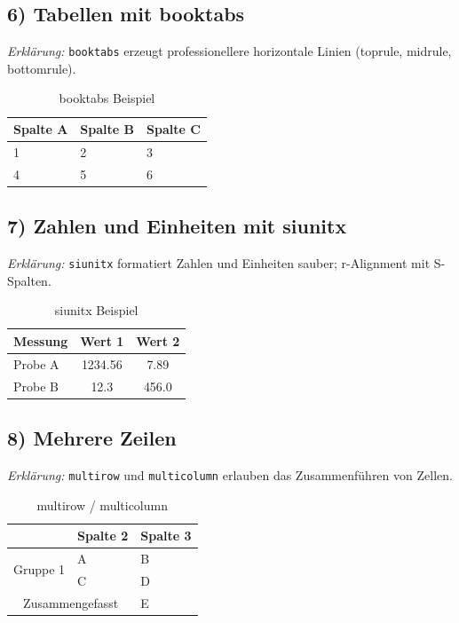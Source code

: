 \documentclass[twoside]{scrreprt}
\begin{document}
\subsection*{6) Tabellen mit booktabs}
	\textit{Erklärung:} \texttt{booktabs} erzeugt professionellere horizontale Linien (toprule, midrule, bottomrule).
\begin{table}[h!]
	\centering
	\caption{booktabs Beispiel}
	\begin{tabular}{lll}
		
		Spalte A & Spalte B & Spalte C \\
		\midrule
		1 & 2 & 3 \\
		4 & 5 & 6 \\
		\bottomrule
	\end{tabular}
\end{table}

\newpage

\subsection*{7) Zahlen und Einheiten mit siunitx}
	\textit{Erklärung:} \texttt{siunitx} formatiert Zahlen und Einheiten sauber; r-Alignment mit S-Spalten.
\begin{table}[h!]
	\centering
	\caption{siunitx Beispiel}
	\begin{tabular}{l S S}
	
		Messung & {Wert 1} & {Wert 2} \\
		\midrule
		Probe A & 1234.56 & 7.89 \\
		Probe B & 12.3 & 456.0 \\
		\bottomrule
	\end{tabular}
\end{table}

\subsection*{8) Mehrere Zeilen }
	\textit{Erklärung:} \texttt{multirow} und \texttt{multicolumn} erlauben das Zusammenführen von Zellen.
	\begin{table}[h!]
	\centering
	\caption{multirow / multicolumn}
	\begin{tabular}{lll}
			\toprule
		& Spalte 2 & Spalte 3 \\
		\midrule
		\multirow{2}{*}{Gruppe 1} & A & B \\
		 & C & D \\
		\midrule
		\multicolumn{2}{c}{Zusammengefasst} & E \\
		\bottomrule
	\end{tabular}
\end{table}
\end{document}
